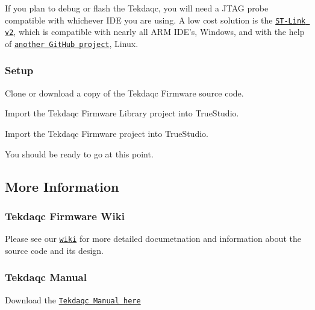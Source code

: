 If you plan to debug or flash the Tekdaqc, you will need a J\-T\-A\-G probe compatible with whichever I\-D\-E you are using. A low cost solution is the \href{http://www.st.com/web/en/catalog/tools/FM146/CL1984/SC724/SS1677/PF251168}{\tt S\-T-\/\-Link v2}, which is compatible with nearly all A\-R\-M I\-D\-E's, Windows, and with the help of \href{https://github.com/texane/stlink}{\tt another Git\-Hub project}, Linux.

\subsubsection*{Setup}


\begin{DoxyEnumerate}
\item Clone or download a copy of the Tekdaqc Firmware source code.
\item Import the Tekdaqc Firmware Library project into True\-Studio.
\item Import the Tekdaqc Firmware project into True\-Studio.
\item You should be ready to go at this point.
\end{DoxyEnumerate}

\subsection*{More Information}

\subsubsection*{Tekdaqc Firmware Wiki}


\begin{DoxyItemize}
\item Please see our \href{https://github.com/Tenkiv/Tekdaqc-Firmware/wiki}{\tt wiki} for more detailed documetnation and information about the source code and its design.
\end{DoxyItemize}

\subsubsection*{Tekdaqc Manual}


\begin{DoxyItemize}
\item Download the \href{http://www.tenkiv.com/tekdaqc_manual_pdf_v3.pdf}{\tt Tekdaqc Manual here}
\end{DoxyItemize}

